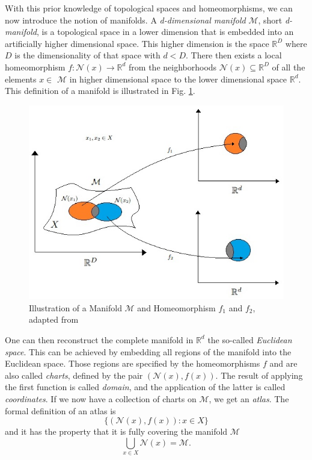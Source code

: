 With this prior knowledge of topological spaces and homeomorphisms, we can now introduce the notion of manifolds. A \textit{d-dimensional manifold} $\mathcal{M}$, short \textit{d-manifold}, is a topological space in a lower dimension that is embedded into an artificially higher dimensional space. This higher dimension is the space $\mathbb{R}^D$ where $D$ is the dimensionality of that space with $d<D$. There then exists a local homeomorphism $f: \mathcal{N}(x) \to \mathbb{R}^d$ from the neighborhoods $\mathcal{N}(x) \subseteq \mathbb{R}^D$ of all the elements $x \in$ $\mathcal{M}$ in higher dimensional space to the lower dimensional space $\mathbb{R}^d$. This definition of a manifold is illustrated in Fig. \ref{fig:manifold}. \cite{Cayton05}
\begin{figure}[!]
	\centering
	\includegraphics[width=\columnwidth]{images/manifold.jpg}
	\caption[Illustration of a Manifold and Homeomorphisms]{Illustration of a Manifold $\mathcal{M}$ and Homeomorphism $f_1$ and $f_2$, adapted from \cite{wiki_atlas}}
    \label{fig:manifold}
\end{figure}

One can then reconstruct the complete manifold in $\mathbb{R}^d$ the so-called \textit{Euclidean space}. This can be achieved by embedding all regions of the manifold into the Euclidean space. Those regions are specified by the homeomorphisms $f$ and are also called \textit{charts}, defined by the pair $(\mathcal{N}(x),f(x))$. The result of applying the first function is called \textit{domain}, and the application of the latter is called \textit{coordinates}. If we now have a collection of charts on $\mathcal{M}$, we get an \textit{atlas}. The formal definition of an atlas is \cite{wiki_atlas}
\begin{equation}
    \bigl\{ (\mathcal{N}(x),f(x)): x \in X \bigr\}
\end{equation}
and it has the property that it is fully covering the manifold $\mathcal{M}$ \cite{wiki_atlas}
\begin{equation}
    \bigcup_{x\in X}\mathcal{N}(x) = \mathcal{M}.
\end{equation}

